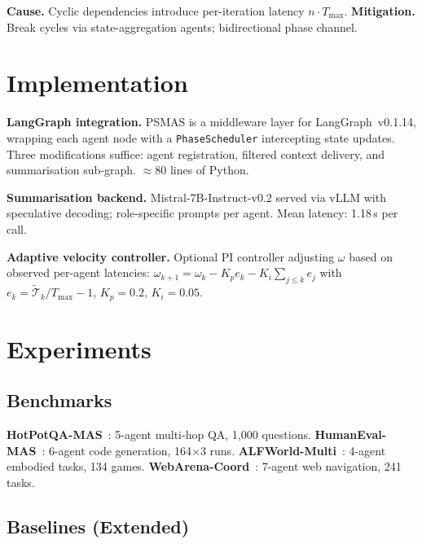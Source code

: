 \documentclass[10pt,twocolumn]{article}
\theoremstyle{plain}
\theoremstyle{definition}
\theoremstyle{remark}
\newcommand{\T}{\mathcal{T}}
\newcommand{\sweepvel}{\omega}
\begin{document}
\begin{tcolorbox}[failmode={F3 --- Convergence Stall}]
\textbf{Cause.} Cyclic dependencies introduce per-iteration latency
$n\cdot T_{\max}$.
\textbf{Mitigation.} Break cycles via state-aggregation agents;
bidirectional phase channel.
\end{tcolorbox}

\section{Implementation}
\label{sec:impl}

\textbf{LangGraph integration.}  PSMAS is a middleware layer for
LangGraph~v0.1.14, wrapping each agent node with a
\texttt{PhaseScheduler} intercepting state updates.
Three modifications suffice: agent registration, filtered context
delivery, and summarisation sub-graph.  $\approx$80 lines of Python.

\textbf{Summarisation backend.}  Mistral-7B-Instruct-v0.2 served via
vLLM with speculative decoding; role-specific prompts per agent.
Mean latency: 1.18\,s per call.

\textbf{Adaptive velocity controller.}  Optional PI controller
adjusting $\sweepvel$ based on observed per-agent latencies:
$\sweepvel_{k+1}=\sweepvel_k - K_p e_k - K_i\!\sum_{j\leq k}\!e_j$
with $e_k=\tilde{\T}_k/T_{\max}-1$, $K_p=0.2$, $K_i=0.05$.

\section{Experiments}
\label{sec:experiments}

\subsection{Benchmarks}
\textbf{HotPotQA-MAS}~\citep{yang2018hotpotqa}: 5-agent multi-hop QA,
1,000 questions.
\textbf{HumanEval-MAS}~\citep{chen2021evaluating}: 6-agent code
generation, 164$\times$3 runs.
\textbf{ALFWorld-Multi}~\citep{shridhar2020alfworld}: 4-agent embodied
tasks, 134 games.
\textbf{WebArena-Coord}~\citep{zhou2023webarena}: 7-agent web
navigation, 241 tasks.

\subsection{Baselines (Extended)}
\label{sec:baselines}
\end{document}

